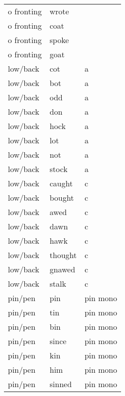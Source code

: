 \begin{longtable}{lll}
o fronting       & wrote       &                      \\
o fronting       & coat        &                      \\
o fronting       & spoke       &                      \\
o fronting       & goat        &                      \\
low/back         & cot         & a                    \\
low/back         & bot         & a                    \\
low/back         & odd         & a                    \\
low/back         & don         & a                    \\
low/back         & hock        & a                    \\
low/back         & lot         & a                    \\
low/back         & not         & a                    \\
low/back         & stock       & a                    \\
low/back         & caught      & c                    \\
low/back         & bought      & c                    \\
low/back         & awed        & c                    \\
low/back         & dawn        & c                    \\
low/back         & hawk        & c                    \\
low/back         & thought     & c                    \\
low/back         & gnawed      & c                    \\
low/back         & stalk       & c                    \\
pin/pen          & pin         & pin mono             \\
pin/pen          & tin         & pin mono             \\
pin/pen          & bin         & pin mono             \\
pin/pen          & since       & pin mono             \\
pin/pen          & kin         & pin mono             \\
pin/pen          & him         & pin mono             \\
pin/pen          & sinned      & pin mono             \\

\end{longtable}
